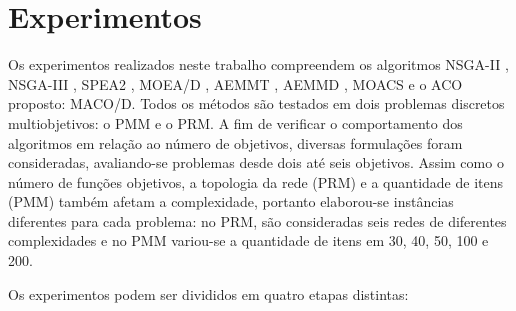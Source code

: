 \chapter[Experimentos]{Experimentos}
\label{chapter_experimentos}

Os experimentos realizados neste trabalho compreendem os algoritmos NSGA-II \cite{Deb2002}, NSGA-III \cite{Deb2014}, SPEA2 \cite{Zitzler2002}, MOEA/D \cite{Zhang2007}, AEMMT \cite{Brasil2013}, AEMMD \cite{Lafeta2016}, MOACS \cite{Riveros2016} e o ACO proposto: MACO/D. Todos os métodos são testados em dois problemas discretos multiobjetivos: o PMM e o PRM. A fim  de verificar o comportamento dos algoritmos em relação ao número de objetivos, diversas formulações foram consideradas, avaliando-se problemas desde dois até seis objetivos. Assim como o número de funções objetivos, a topologia da rede (PRM) e a quantidade de itens (PMM) também afetam a complexidade, portanto elaborou-se instâncias diferentes para cada problema: no PRM, são consideradas seis redes de diferentes complexidades e no PMM variou-se a quantidade de itens em 30, 40, 50, 100 e 200.

Os experimentos podem ser divididos em quatro etapas distintas:

